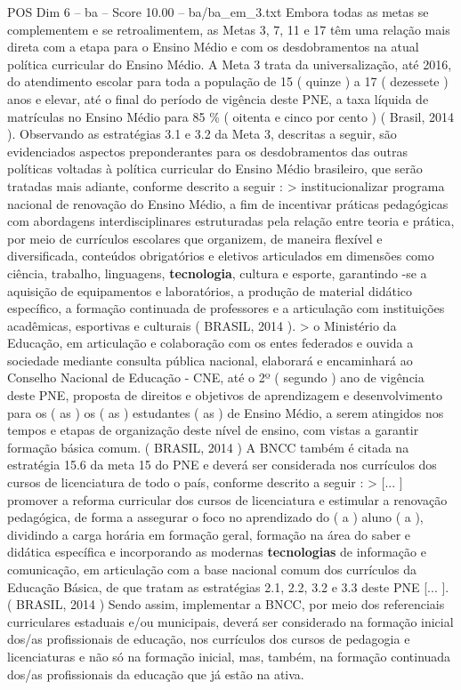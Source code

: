 \begin{textsample}{POS Dim 6 – ba – Score 10.00 – ba/ba\_em\_3.txt}
Embora todas as metas se complementem e se retroalimentem, as Metas 3, 7, 11 e 17 têm uma relação mais direta com a etapa para o Ensino Médio e com os desdobramentos na atual política curricular do Ensino Médio.
A Meta 3 trata da universalização, até 2016, do atendimento escolar para toda a população de 15 ( quinze ) a 17 ( dezessete ) anos e elevar, até o final do período de vigência deste PNE, a taxa líquida de matrículas no Ensino Médio para 85 \% ( oitenta e cinco por cento ) ( Brasil, 2014 ).
Observando as estratégias 3.1 e 3.2 da Meta 3, descritas a seguir, são evidenciados aspectos preponderantes para os desdobramentos das outras políticas voltadas à política curricular do Ensino Médio brasileiro, que serão tratadas mais adiante, conforme descrito a seguir : > institucionalizar programa nacional de renovação do Ensino Médio, a fim de incentivar práticas pedagógicas com abordagens interdisciplinares estruturadas pela relação entre teoria e prática, por meio de currículos escolares que organizem, de maneira flexível e diversificada, conteúdos obrigatórios e eletivos articulados em dimensões como ciência, trabalho, linguagens, \textbf{tecnologia}, cultura e esporte, garantindo -se a aquisição de equipamentos e laboratórios, a produção de material didático específico, a formação continuada de professores e a articulação com instituições acadêmicas, esportivas e culturais ( BRASIL, 2014 ). > o Ministério da Educação, em articulação e colaboração com os entes federados e ouvida a sociedade mediante consulta pública nacional, elaborará e encaminhará ao Conselho Nacional de Educação - CNE, até o 2º ( segundo ) ano de vigência deste PNE, proposta de direitos e objetivos de aprendizagem e desenvolvimento para os ( as ) os ( as ) estudantes ( as ) de Ensino Médio, a serem atingidos nos tempos e etapas de organização deste nível de ensino, com vistas a garantir formação básica comum. ( BRASIL, 2014 ) A BNCC também é citada na estratégia 15.6 da meta 15 do PNE e deverá ser considerada nos currículos dos cursos de licenciatura de todo o país, conforme descrito a seguir : > [... ] promover a reforma curricular dos cursos de licenciatura e estimular a renovação pedagógica, de forma a assegurar o foco no aprendizado do ( a ) aluno ( a ), dividindo a carga horária em formação geral, formação na área do saber e didática específica e incorporando as modernas \textbf{tecnologias} de informação e comunicação, em articulação com a base nacional comum dos currículos da Educação Básica, de que tratam as estratégias 2.1, 2.2, 3.2 e 3.3 deste PNE [... ]. ( BRASIL, 2014 ) Sendo assim, implementar a BNCC, por meio dos referenciais curriculares estaduais e/ou municipais, deverá ser considerado na formação inicial dos/as profissionais de educação, nos currículos dos cursos de pedagogia e licenciaturas e não só na formação inicial, mas, também, na formação continuada dos/as profissionais da educação que já estão na ativa.

\end{textsample}

